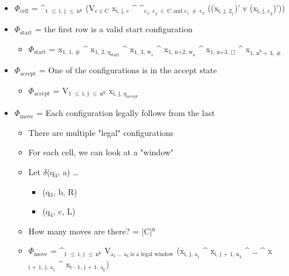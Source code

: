 \documentclass[11pt]{article}
\begin{document}
\begin{itemize}
\item \(\Phi_{\text{cell}}\) = \^{}\(_{\text{1 }\le\ \text{i, j }\le\ \text{n}^{\text{k}}}\) (V\(_{\text{c }\in\ \text{C}}\) x\(_{\text{i, j, c}}\) \^{} \^{}\(_{\text{c}_{\text{1}}\text{, c}_{\text{2}} \ \in\ \text{C and c}_{\text{1}} \ \ne\ \text{c}_{\text{2}}}\) ((x\(_{\text{i, j, 2}_{\text{1}}}\))' v (x\(_{\text{i, j, c}_{\text{2}}}\))'))
\item \(\Phi_{\text{start}}\) = the first row is a valid start configuration
\begin{itemize}
\item \(\Phi_{\text{start}}\) = x\(_{\text{1, 1, \#}}\) \^{} x\(_{\text{1, 2, q}_{\text{start}}}\) \^{} x\(_{\text{1, 3, w}_{\text{1}}}\) \^{} x\(_{\text{1, n+2, w}_{\text{n}}}\) \^{} x\(_{\text{1, n+3, }\Box}\) \^{} x\(_{\text{1, n}^{\text{k}} \ \text{+ 3, \#}}\)
\end{itemize}
\item \(\Phi_{\text{accept}}\) = One of the configurations is in the accept state
\begin{itemize}
\item \(\Phi_{\text{accept}}\) = V\(_{\text{1 }\le\ \text{i, j }\le\ \text{n}^{\text{k}}}\) x\(_{\text{i, j, q}_{\text{accept}}}\)
\end{itemize}
\item \(\Phi_{\text{move}}\) = Each configuration legally follows from the last 
\begin{itemize}
\item There are multiple "legal" configurations
\item For each cell, we can look at a "window"
\item Let \(\delta\)(q\(_{\text{3}}\), a) \ldots{}
\begin{itemize}
\item (q\(_{\text{3}}\), b, R)
\item (q\(_{\text{4}}\), c, L)
\end{itemize}
\item How many moves are there?
= |C|\(^{\text{6}}\)
\item \(\Phi_{\text{move}}\) = \^{}\(_{\text{1 }\le\ \text{i, j }\le\ \text{n}^{\text{k}}}\) V\(_{\text{a}_{\text{1}} \ \text{\ldots{} a}_{\text{6}} \ \text{is a legal window}}\) (x\(_{\text{i, j, a}_{\text{1}}}\) \^{} x\(_{\text{i, j + 1, n}_{\text{3}}}\) \^{} \ldots{} \^{} x\(_{\text{i + 1, j, a}_{\text{5}}}\) \^{} x\(_{\text{i - 1, j + 1, a}_{\text{6}}}\))
\end{itemize}
\end{itemize}
\end{document}
